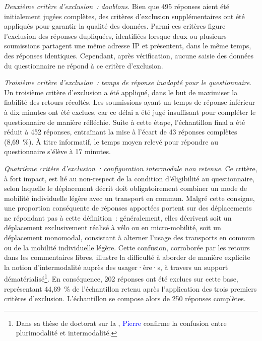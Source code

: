 \begin{refsegment}
\textsl{Deuxième critère d'exclusion~: doublons}. Bien que 495 réponses aient été initialement jugées complètes, des critères d'exclusion supplémentaires ont été appliqués pour garantir la qualité des données. Parmi ces critères figure l'exclusion des réponses dupliquées, identifiées lorsque deux ou plusieurs soumissions partagent une même adresse IP et présentent, dans le même temps, des réponses identiques. Cependant, après vérification, aucune saisie des données du questionnaire ne répond à ce critère d'exclusion.%

\textsl{Troisième critère d'exclusion~: temps de réponse inadapté pour le questionnaire}. Un troisième critère d’exclusion a été appliqué, dans le but de maximiser la fiabilité des retours récoltés. Les soumissions ayant un temps de réponse inférieur à dix minutes ont été exclues, car ce délai a été jugé insuffisant pour compléter le questionnaire de manière réfléchie. Suite à cette étape, l’échantillon final a été réduit à 452 réponses, entraînant la mise à l'écart de 43 réponses complètes (8,69~\%). À titre informatif, le temps moyen relevé pour répondre au questionnaire s'élève à 17 minutes.%

\textsl{Quatrième critère d'exclusion~: configuration intermodale non retenue}. Ce critère, à fort impact, est lié au non-respect de la condition d’éligibilité au questionnaire, selon laquelle le déplacement décrit doit obligatoirement combiner un mode de mobilité individuelle légère avec un transport en commun. Malgré cette consigne, une proportion conséquente de réponses apportées portent sur des déplacements ne répondant pas à cette définition~: généralement, elles décrivent soit un déplacement exclusivement réalisé à vélo ou en micro-mobilité, soit un déplacement monomodal, consistant à alterner l'usage des transports en commun ou de la mobilité individuelle légère. Cette confusion, corroborée par les retours dans les commentaires libres, illustre la difficulté à aborder de manière explicite la notion d’intermodalité auprès des usager·ère·s, à travers un support dématérialisé\footnote{
    Dans sa thèse de doctorat sur la , \textcolor{blue}{Pierre} \textcolor{blue}{\textcite[41]{ageron_intermodalite-voyageurs_2013}} confirme la confusion entre plurimodalité et intermodalité.
}. En conséquence, 202 réponses ont été exclues sur cette base, représentant 44,69~\% de l’échantillon retenu après l’application des trois premiers critères d’exclusion. L’échantillon se compose alors de 250 réponses complètes.%


\end{refsegment}
